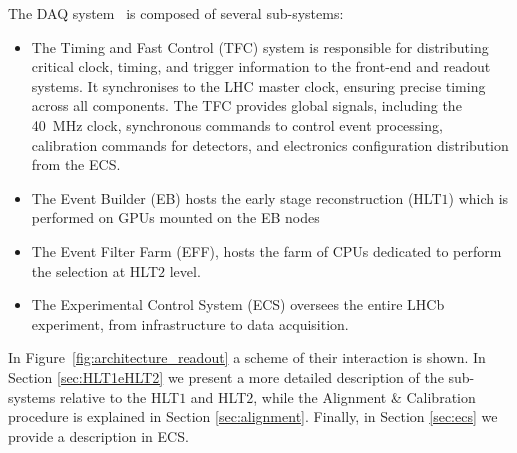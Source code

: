 The DAQ system~\cite{CERN-LHCC-2014-016} is composed of several sub-systems:
\begin{itemize}
\item The Timing and Fast Control (TFC) system is responsible for distributing critical clock, timing, and trigger information to the front-end and readout systems. It synchronises to the LHC master clock, ensuring precise timing across all components. The TFC provides global signals, including the \SI{40}{\mega\hertz} clock, synchronous commands to control event processing, calibration commands for detectors, and electronics configuration distribution from the ECS.

\item The Event Builder (EB) hosts the early stage reconstruction (HLT$1$) which is performed on GPUs mounted on the EB nodes

\item The Event Filter Farm (EFF), hosts the farm of CPUs dedicated to perform the selection at HLT$2$ level.

\item The Experimental Control System (ECS) oversees the entire LHCb experiment, from infrastructure to data acquisition.
\end{itemize}
In Figure~\ref{fig:architecture_readout} a scheme of their interaction is shown.
In Section \ref{sec:HLT1eHLT2} we present a more detailed description of the sub-systems relative to the HLT$1$ and HLT$2$, while the Alignment \& Calibration procedure is explained in Section \ref{sec:alignment}. Finally, in Section \ref{sec:ecs} we provide a description in ECS. 

